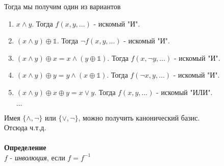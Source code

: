 \documentclass[12pt]{article}
\begin{document}
Тогда мы получим один из вариантов
\begin{enumerate}
    \item $x\land y$. Тогда $f(x,y,\ldots)$ - искомый "И".
    \item $(x\land y) \oplus \mathbb{1}$. Тогда $\lnot f(x,y,\ldots)$ - искомый "И".
    \item $(x\land y) \oplus x = x\land(y\oplus \mathbb{1})$. Тогда $f(x,\lnot y,\ldots)$ - искомый "И".
    \item $(x\land y) \oplus y = y\land(x\oplus \mathbb{1})$. Тогда $f(\lnot x,y,\ldots)$ - искомый "И".
    \item $(x\land y) \oplus x \oplus y = x \lor y$. Тогда $f(x,y,\ldots)$ - искомый "ИЛИ".
    \item[$\ldots$]
\end{enumerate}
Имея $\{\land,\lnot\}$ или $\{\lor,\lnot\}$, можно получить канонический базис.\\
Отсюда ч.т.д.\\\\
\textbf{Определение}\\
$f$ - \textit{инволюция}, если $f = f^{-1} $
\end{document}

